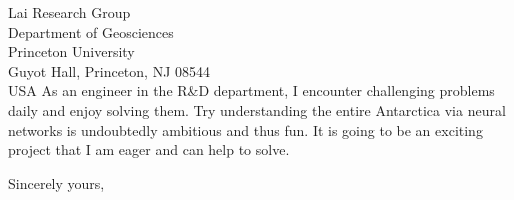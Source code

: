 \documentclass[12pt]{letter} %
\begin{document}
\begin{letter}{
Lai Research Group\\
Department of Geosciences\\
Princeton University\\
Guyot Hall, Princeton, NJ 08544\\
USA
}
As an engineer in the R\&D department, I encounter challenging problems daily and enjoy solving them. 
Try understanding the entire Antarctica via neural networks is undoubtedly ambitious and thus fun.
It is going to be an exciting project that I am eager and can help to solve. \\

\closing{Sincerely yours,}


\end{letter}
\end{document}

